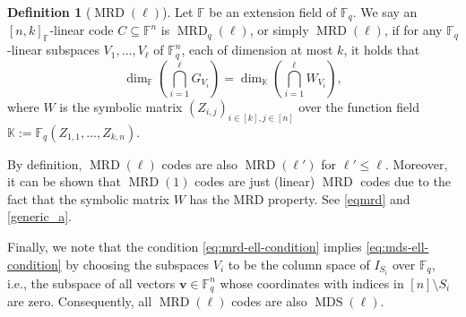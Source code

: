 \documentclass[11pt]{article}
\theoremstyle{plain}
\theoremstyle{definition}
\newtheorem{defn}[thm]{Definition}
\theoremstyle{remark}
\newcommand{\F}{\mathbb{F}}
\newcommand{\K}{\mathbb{K}}
\newcommand{\bv}{\bm{v}}
\begin{document}
\begin{defn}[$\operatorname{MRD}(\ell)$]
Let $\F$ be an extension field of $
\F_q$. 
We say an $[n,k]_{\F}$-linear code $C\subseteq\F^n$ is $\operatorname{MRD}_q(\ell)$, or simply $\operatorname{MRD}(\ell)$, if for any $\F_q$-linear subspaces $V_1,\dots,V_\ell$ of $\F_q^n$, each of dimension at most $k$, it holds that
\begin{equation}\label{eq:mrd-ell-condition}
\dim_{\F}\left(\bigcap_{i=1}^\ell G_{V_i}\right)=\dim_{\mathbb{K}}\left(\bigcap_{i=1}^\ell W_{V_i}\right),
\end{equation}
where $W$ is the symbolic matrix $\left(Z_{i,j}\right)_{i\in [k], j\in [n]}$ over the function field $\K:=\F_q(Z_{1,1},\dots,Z_{k,n})$.
\end{defn}
By definition, $\operatorname{MRD}(\ell)$ codes are also $\operatorname{MRD}(\ell')$ for $\ell'\leq \ell$. Moreover, it can be shown that $\operatorname{MRD}(1)$ codes are just (linear) $\operatorname{MRD}$ codes due to the fact that the symbolic matrix $W$ has the MRD property. See \cref{eqmrd} and \cref{generic_a}.

Finally, we note that the condition \eqref{eq:mrd-ell-condition} implies \eqref{eq:mds-ell-condition} by choosing the subspaces $V_i$ to be the column space of $I_{S_i}$ over $\F_q$, i.e., the subspace of all vectors $\bv\in\F_q^n$ whose coordinates with indices in $[n]\setminus S_i$ are zero.
Consequently, all $\operatorname{MRD}(\ell)$ codes are also $\operatorname{MDS}(\ell)$.
\end{document}
